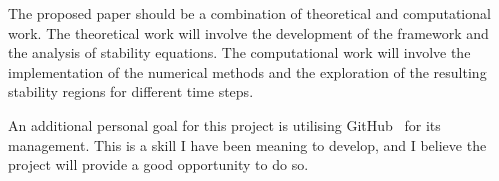 \documentclass[a4paper, fleqn]{article}
\begin{document}
\par The proposed paper should be a combination of theoretical and computational work.
The theoretical work will involve the development of the framework and the analysis of stability equations.
The computational work will involve the implementation of the numerical methods and the exploration of the resulting stability regions for different time steps.\\

\par An additional personal goal for this project is utilising GitHub~\cite{GitHub_Repo} for its management.
This is a skill I have been meaning to develop, and I believe the project will provide a good opportunity to do so.\\



\end{document}
